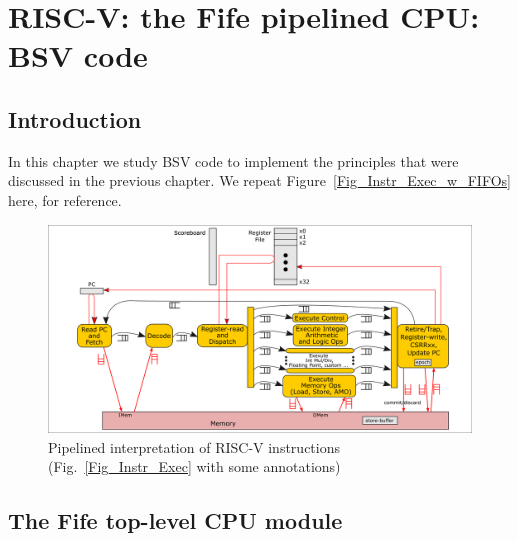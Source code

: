 

\chapter{RISC-V: the Fife pipelined CPU: BSV code}


\setcounter{page}{1}
\renewcommand{\thepage}{\arabic{chapter}-\arabic{page}}

\label{ch_Fife_Code}


\section{Introduction}

In this chapter we study BSV code to implement the principles that
were discussed in the previous chapter.  We repeat
Figure~\ref{Fig_Instr_Exec_w_FIFOs} here, for reference.
\begin{figure}[htbp]
  \centerline{\includegraphics[width=6in,angle=0]{Figures/Fig_Instr_Exec_w_FIFOs}}
  \caption{\label{Fig_Instr_Exec_w_FIFOs_2}Pipelined interpretation of RISC-V instructions (Fig.~\ref{Fig_Instr_Exec} with some annotations)}
\end{figure}


\section{The Fife top-level CPU module}

